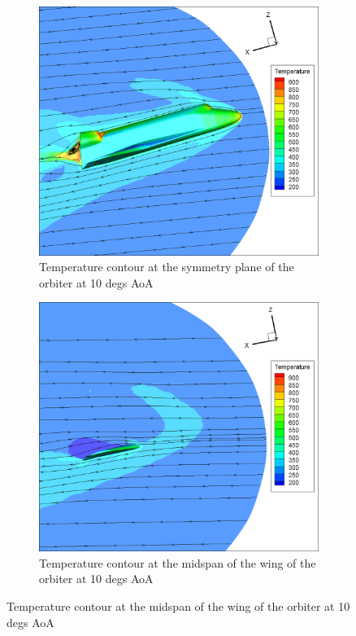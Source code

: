 \begin{figure}[H]

	\centering
    \begin{subfigure}[b]{0.65\textwidth}
         \centering
		 \includegraphics[width=\textwidth]{report_images/10_sym_temp_contour.png}
		 \caption{Temperature contour at the symmetry plane of the orbiter at 10 degs AoA}
		 \label{fig: 10_sym_temp_contour}
    \end{subfigure} 
    \begin{subfigure}[b]{0.65\textwidth}
         \centering
		 \includegraphics[width=\textwidth]{report_images/10_wing_temp_contour.png}
		 \caption{Temperature contour at the midspan of the wing of the orbiter at 10 degs AoA}
		 \label{fig: 10_wing_temp_contour}
    \end{subfigure}
\end{figure}

